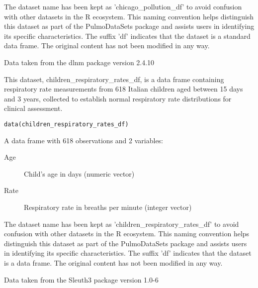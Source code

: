 \documentclass[a4paper]{book}
\begin{document}
%
\begin{Details}
The dataset name has been kept as 'chicago\_pollution\_df' to avoid confusion with other datasets
in the R ecosystem. This naming convention helps distinguish this dataset as part of the
PulmoDataSets package and assists users in identifying its specific characteristics.
The suffix 'df' indicates that the dataset is a standard data frame. The original content has not been modified
in any way.
\end{Details}
%
\begin{Source}
Data taken from the dlnm package version 2.4.10
\end{Source}
%
\begin{Description}
This dataset, children\_respiratory\_rates\_df, is a data frame containing respiratory rate
measurements from 618 Italian children aged between 15 days and 3 years, collected to
establish normal respiratory rate distributions for clinical assessment.
\end{Description}
%
\begin{Usage}
\begin{verbatim}
data(children_respiratory_rates_df)
\end{verbatim}
\end{Usage}
%
\begin{Format}
A data frame with 618 observations and 2 variables:
\begin{description}

\item[Age] Child's age in days (numeric vector)
\item[Rate] Respiratory rate in breaths per minute (integer vector)

\end{description}

\end{Format}
%
\begin{Details}
The dataset name has been kept as 'children\_respiratory\_rates\_df' to avoid confusion with other datasets
in the R ecosystem. This naming convention helps distinguish this dataset as part of the
PulmoDataSets package and assists users in identifying its specific characteristics.
The suffix 'df' indicates that the dataset is a data frame. The original content has not been modified
in any way.
\end{Details}
%
\begin{Source}
Data taken from the Sleuth3 package version 1.0-6
\end{Source}
\end{document}
